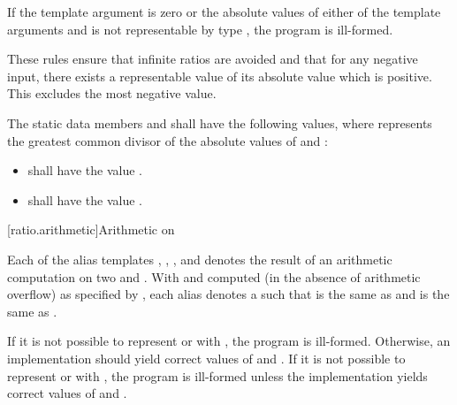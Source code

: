 \pnum
{}%
If the template argument  is zero or the absolute values of either of the
template arguments  and  is not representable by type
, the program is ill-formed.
\begin{note}
These rules ensure that infinite
ratios are avoided and that for any negative input, there exists a representable value
of its absolute value which is positive.
This excludes the most negative value.
\end{note}

\pnum
The static data members  and  shall have the following values,
where  represents the greatest common divisor of the absolute values of
 and :

\begin{itemize}
\item {} shall have the value .
\item {} shall have the value .
\end{itemize}

[ratio.arithmetic]{Arithmetic on }

\pnum
{}%
%
%
%
Each of the alias templates , , ,
and  denotes the result of an arithmetic computation on two
  and . With  and  computed (in the
absence of arithmetic overflow) as specified by , each alias
denotes a  such that  is the same as  and
 is the same as .

\pnum
If it is not possible to represent  or  with , the program is
ill-formed. Otherwise, an implementation should yield correct values of  and
. If it is not possible to represent  or  with , the
program is ill-formed unless the implementation yields correct values of  and
.

